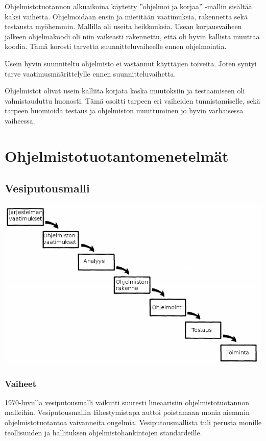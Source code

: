 \documentclass[finnish]{tktltiki2}
\theoremstyle{definition}
\theoremstyle{remark}
\begin{document}
Ohjelmistotuotannon alkuaikoina käytetty ''ohjelmoi ja korjaa'' -mallin sisältää kaksi vaihetta. Ohjelmoidaan ensin ja mietitään vaatimuksia, rakennetta sekä testausta myöhemmin. Mallilla oli useita heikkouksia. Usean korjausvaiheen jälkeen ohjelmakoodi oli niin vaikeasti rakennettu, että oli hyvin kallista muuttaa koodia. Tämä korosti tarvetta suunnitteluvaiheelle ennen ohjelmointia.\cite{BOE88}

Usein hyvin suunniteltu ohjelmisto ei vastannut käyttäjien toiveita. Joten syntyi tarve vaatimusmäärittelylle ennen suunnitteluvaihetta.\cite{BOE88} 

Ohjelmistot olivat usein kalliita korjata koska muutoksiin ja testaamiseen oli valmistauduttu huonosti. Tämä osoitti tarpeen eri vaiheiden tunnistamiselle, sekä tarpeen huomioida testaus ja ohjelmiston muuttuminen jo hyvin varhaisessa vaiheessa.\cite{BOE88} 

   

\section{Ohjelmistotuotantomenetelmät}

\subsection{Vesiputousmalli}

\includegraphics[width=\textwidth]{waterfall}

\subsubsection{Vaiheet}
1970-luvulla vesiputousmalli vaikutti suuresti lineaarisiin ohjelmistotuotannon malleihin. Vesiputousmallin lähestymistapa auttoi poistamaan monia aiemmin ohjelmistotuotantoa vaivanneita ongelmia. Vesiputousmallista tuli perusta monille teollisuuden ja hallituksen ohjelmistohankintojen standardeille. \cite{BOE88}
\end{document}
